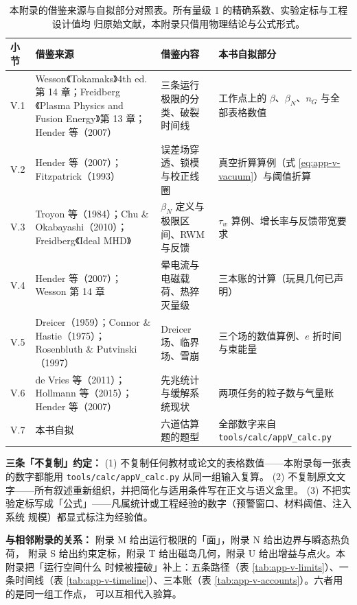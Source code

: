 \begin{table}[htbp]
\centering
\small
\caption{本附录的借鉴来源与自拟部分对照表。所有量级 1 的精确系数、实验定标与工程设计值均
归原始文献，本附录只借用物理结论与公式形式。}
\label{tab:app-v-source}
\begin{tabular}{@{}p{1.4cm}p{5.4cm}p{4.0cm}p{3.4cm}@{}}
\toprule
小节 & 借鉴来源 & 借鉴内容 & 本书自拟部分 \\
\midrule
V.1 & Wesson《Tokamaks》4th ed. 第 14 章；Freidberg《Plasma Physics and Fusion Energy》第 13 章；Hender 等（2007） & 三条运行极限的分类、破裂时间线 & 工作点上的 $\beta$、$\beta_N$、$n_G$ 与全部表格数值 \\
V.2 & Hender 等（2007）；Fitzpatrick（1993） & 误差场穿透、锁模与校正线圈 & 真空折算算例（式 \eqref{eq:app-v-vacuum}）与阈值折算 \\
V.3 & Troyon 等（1984）；Chu \& Okabayashi（2010）；Freidberg《Ideal MHD》 & $\beta_N$ 定义与极限区间、RWM 与反馈 & $\tau_w$ 算例、增长率与反馈带宽要求 \\
V.4 & Hender 等（2007）；Wesson 第 14 章 & 晕电流与电磁载荷、热猝灭量级 & 三本账的计算（玩具几何已声明） \\
V.5 & Dreicer（1959）；Connor \& Hastie（1975）；Rosenbluth \& Putvinski（1997） & Dreicer 场、临界场、雪崩 & 三个场的数值算例、$e$ 折时间与束能量 \\
V.6 & de Vries 等（2011）；Hollmann 等（2015）；Hender 等（2007） & 先兆统计与缓解系统现状 & 两项任务的粒子数与气量账 \\
V.7 & 本书自拟 & 六道估算题的题型 & 全部数字来自 \texttt{tools/\allowbreak{}calc/\allowbreak{}appV\_calc.py} \\
\bottomrule
\end{tabular}

\end{table}

\textbf{三条「不复制」约定：}
(1) 不复制任何教材或论文的表格数值——本附录每一张表的数字都能用
\texttt{tools/\allowbreak{}calc/\allowbreak{}appV\_calc.py} 从同一组输入复算。
(2) 不复制原文文字——所有叙述重新组织，并把简化与适用条件写在正文与语义盒里。
(3) 不把实验定标写成「公式」——凡属统计或工程经验的数字（预警窗口、材料阈值、注入系统
规模）都显式标注为经验值。

\textbf{与相邻附录的关系：} 附录 M 给出运行极限的「面」，附录 N 给出边界与瞬态热负荷，
附录 S 给出约束定标，附录 T 给出磁岛几何，附录 U 给出增益与点火。本附录把「运行空间什么
时候被撞破」补上：五条路径（表 \ref{tab:app-v-limits}）、一条时间线（表
\ref{tab:app-v-timeline}）、三本账（表 \ref{tab:app-v-accounts}）。六者用的是同一组工作点，
可以互相代入验算。
\endgroup
